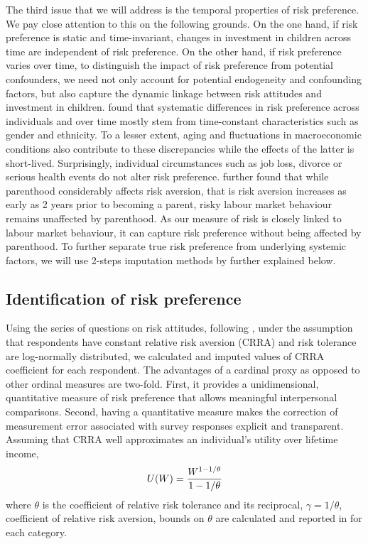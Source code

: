 \documentclass[emulatestandardclasses, 10pt, abstract = true]{scrartcl}
\begin{document}
The third issue that we will address is the temporal properties of risk preference. We pay close attention to this on the following grounds. On the one hand, if risk preference is static and time-invariant, changes in investment in children across time are independent of risk preference. On the other hand, if risk preference varies over time, to distinguish the impact of risk preference from potential confounders, we need not only account for potential endogeneity and confounding factors, but also capture the dynamic linkage between risk attitudes and investment in children. \citet{sahm2012much} found that systematic differences in risk preference across individuals and over time mostly stem from time-constant characteristics such as gender and ethnicity. To a lesser extent, aging and fluctuations in macroeconomic conditions also contribute to these discrepancies while the effects of the latter is short-lived. Surprisingly, individual circumstances such as job loss, divorce or serious health events do not alter risk preference. \citet{gorlitz2020parenthood} further found that while parenthood considerably affects risk aversion, that is risk aversion increases as early as 2 years prior to becoming a parent, risky labour market behaviour remains unaffected by parenthood. As our measure of risk is closely linked to labour market behaviour, it can capture risk preference without being affected by parenthood. To further separate true risk preference from underlying systemic factors, we will use 2-steps imputation methods by \citet{kimball2008imputing,kimball2009risk} further explained below.   



\subsection{Identification of risk preference}

Using the series of questions on risk attitudes, following \citet{kimball2008imputing,kimball2009risk}, under the assumption that respondents have constant relative risk aversion (CRRA) and risk tolerance are log-normally distributed, we calculated and imputed values of CRRA coefficient for each respondent. The advantages of a cardinal proxy as opposed to other ordinal measures are two-fold. First, it provides a unidimensional, quantitative measure of risk preference that allows meaningful interpersonal comparisons. Second, having a quantitative measure makes the correction of measurement error associated with survey responses explicit and transparent. Assuming that CRRA well approximates an individual's utility over lifetime income,
\[U(W)={W^{1-{1/\theta}}\over 1-{1/\theta}}\]
where $\theta$ is the coefficient of relative risk tolerance and its reciprocal, $\gamma = 1/\theta$, coefficient of relative risk aversion, bounds on $\theta$ are calculated and reported in  for each category. 
\end{document}
